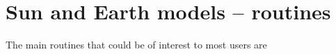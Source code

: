 \section{Sun and Earth models -- routines}

The main routines that could be of interest to most users are

